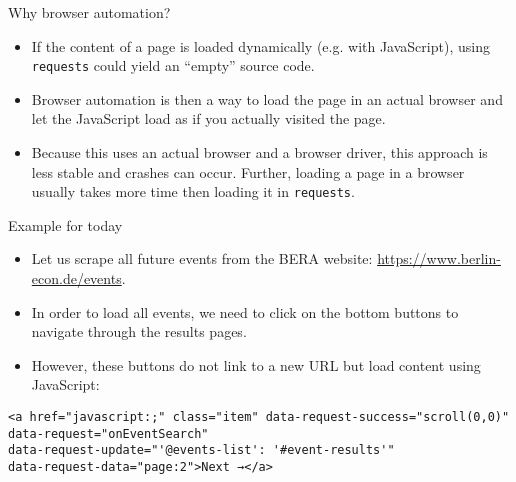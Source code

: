 \begin{frame}[fragile]{Why browser automation?}
\begin{itemize}
	\item If the content of a page is loaded dynamically (e.g. with JavaScript), using \verb!requests! could yield an ``empty'' source code.
	\item Browser automation is then a way to load the page in an actual browser and let the JavaScript load as if you actually visited the page.
	\item Because this uses an actual browser and a browser driver, this approach is less stable and crashes can occur. Further, loading a page in a browser usually takes more time then loading it in \verb!requests!.
\end{itemize}
\end{frame}

\begin{frame}[fragile]{Example for today}
\begin{itemize}
	\item Let us scrape all future events from the BERA website: \url{https://www.berlin-econ.de/events}.
	\item In order to load all events, we need to click on the bottom buttons to navigate through the results pages.
	\item However, these buttons do not link to a new URL but load content using JavaScript:
\end{itemize}
\begin{verbatim}
<a href="javascript:;" class="item" data-request-success="scroll(0,0)" 
data-request="onEventSearch" 
data-request-update="'@events-list': '#event-results'" 
data-request-data="page:2">Next →</a>
\end{verbatim}
\end{frame}

